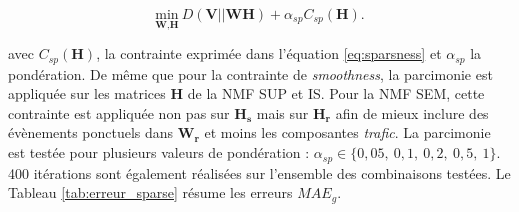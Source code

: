 \begin{equation}
\underset{\textbf{W},\textbf{H}}{\text{min}}~D\left(\textbf{V} \vert\vert \textbf{WH}\right) + \alpha_{sp} C_{sp}(\mathbf{H}).
\end{equation}

avec $C_{sp}(\mathbf{H})$, la contrainte exprimée dans l'équation \ref{eq:sparsness} et $\alpha_{sp}$ la pondération. De même que pour la contrainte de \textit{smoothness}, la parcimonie est appliquée sur les matrices $\mathbf{H}$ de la NMF SUP et IS. Pour la NMF SEM, cette contrainte est appliquée non pas sur $\mathbf{H_s}$ mais sur $\mathbf{H_r}$ afin de mieux inclure des évènements ponctuels dans $\mathbf{W_r}$ et moins les composantes \textit{trafic}. La parcimonie est testée pour plusieurs valeurs de pondération : $\alpha_{sp} \in \lbrace0,05,~ 0,1,~ 0,2,~ 0,5,~ 1\rbrace$. 400 itérations sont également réalisées sur l'ensemble des combinaisons testées. Le Tableau \ref{tab:erreur_sparse} résume les erreurs $MAE_g$.

\begin{table}[h!]
\centering
\caption{Erreurs $MAE_{60}$ pour les combinaisons optimales des modalités des estimateurs pour le corpus d'évaluation \textit{SOUR} en présence d'une pondération de parcimonie.}
\label{tab:erreur_sparse}
\end{table}

